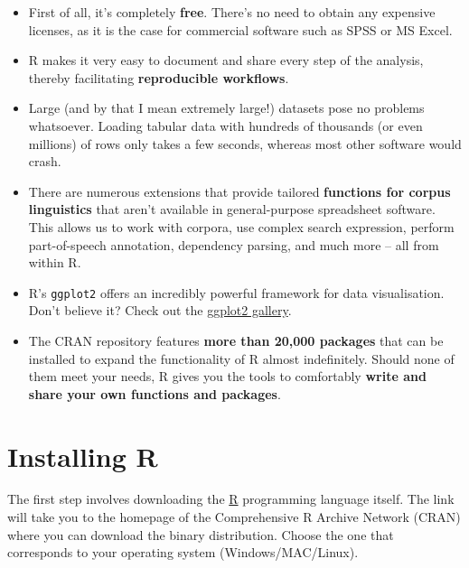 \documentclass[
  11pt,
  letterpaper,
  DIV=11,
  numbers=noendperiod]{scrreprt}
\begin{document}
\begin{itemize}
\item
  First of all, it's completely \textbf{free}. There's no need to obtain
  any expensive licenses, as it is the case for commercial software such
  as SPSS or MS Excel.
\item
  R makes it very easy to document and share every step of the analysis,
  thereby facilitating \textbf{reproducible workflows}.
\item
  Large (and by that I mean extremely large!) datasets pose no problems
  whatsoever. Loading tabular data with hundreds of thousands (or even
  millions) of rows only takes a few seconds, whereas most other
  software would crash.
\item
  There are numerous extensions that provide tailored \textbf{functions
  for corpus linguistics} that aren't available in general-purpose
  spreadsheet software. This allows us to work with corpora, use complex
  search expression, perform part-of-speech annotation, dependency
  parsing, and much more -- all from within R.
\item
  R's \texttt{ggplot2} offers an incredibly powerful framework for data
  visualisation. Don't believe it? Check out the
  \href{https://r-graph-gallery.com/ggplot2-package.html}{ggplot2
  gallery}.
\item
  The CRAN repository features \textbf{more than 20,000 packages} that
  can be installed to expand the functionality of R almost indefinitely.
  Should none of them meet your needs, R gives you the tools to
  comfortably \textbf{write and share your own functions and packages}.
\end{itemize}

\section{Installing R}\label{installing-r}

The first step involves downloading the
\href{https://ftp.fau.de/cran/}{R} programming language itself. The link
will take you to the homepage of the Comprehensive R Archive Network
(CRAN) where you can download the binary distribution. Choose the one
that corresponds to your operating system (Windows/MAC/Linux).
\end{document}
